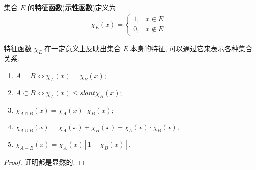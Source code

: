 \documentclass[../../main.tex]{subfiles}
\begin{document}
\begin{definition}
集合 $E$ 的\textbf{特征函数}(\textbf{示性函数})定义为
\begin{align*}
\chi_E(x) = 
\begin{cases}
1, & x \in E\\
0, & x \notin E
\end{cases}
\end{align*}
\end{definition}
\begin{note}
特征函数 $\chi_E$ 在一定意义上反映出集合 $E$ 本身的特征, 可以通过它来表示各种集合关系.
\end{note}

\begin{proposition}[特征函数的基本性质]\label{proposition:特征函数的基本性质}
\begin{enumerate}[(1)]
\item  $A = B \Leftrightarrow \chi_A(x) = \chi_B(x)$; 
\item $A \subset B \Leftrightarrow \chi_A(x) \leqslant slant \chi_B(x)$;
\item $\chi_{A \cap B}(x) = \chi_A(x) \cdot \chi_B(x)$;
\item $\chi_{A \cup B}(x) = \chi_A(x) + \chi_B(x) - \chi_A(x) \cdot \chi_B(x)$;
\item $\chi_{A - B}(x) = \chi_A(x)[1 - \chi_B(x)]$.
\end{enumerate} 
\end{proposition}
\begin{proof}
证明都是显然的.
\end{proof}
\end{document}
